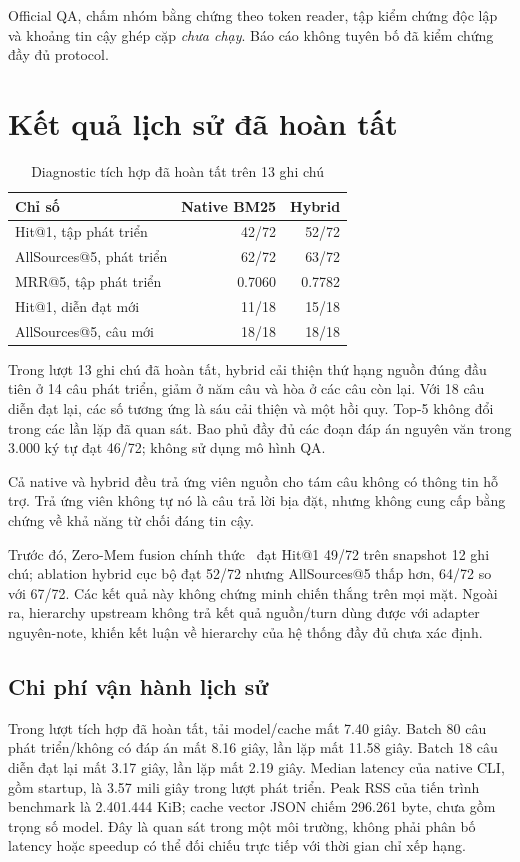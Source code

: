 \documentclass[conference]{IEEEtran}
\begin{document}
Official QA, chấm nhóm bằng chứng theo token reader, tập kiểm chứng độc lập và khoảng tin cậy ghép cặp \emph{chưa chạy}. Báo cáo không tuyên bố đã kiểm chứng đầy đủ protocol.

\section{Kết quả lịch sử đã hoàn tất}
\begin{table}[t]
\caption{Diagnostic tích hợp đã hoàn tất trên 13 ghi chú}
\label{tab:historical}
\centering\small
\begin{tabular}{@{}lrr@{}}
\toprule
Chỉ số & Native BM25 & Hybrid \\
\midrule
Hit@1, tập phát triển & 42/72 & 52/72 \\
AllSources@5, phát triển & 62/72 & 63/72 \\
MRR@5, tập phát triển & 0.7060 & 0.7782 \\
Hit@1, diễn đạt mới & 11/18 & 15/18 \\
AllSources@5, câu mới & 18/18 & 18/18 \\
\bottomrule
\end{tabular}
\end{table}

Trong lượt 13 ghi chú đã hoàn tất, hybrid cải thiện thứ hạng nguồn đúng đầu tiên ở 14 câu phát triển, giảm ở năm câu và hòa ở các câu còn lại. Với 18 câu diễn đạt lại, các số tương ứng là sáu cải thiện và một hồi quy. Top-5 không đổi trong các lần lặp đã quan sát. Bao phủ đầy đủ các đoạn đáp án nguyên văn trong 3.000 ký tự đạt 46/72; không sử dụng mô hình QA.

Cả native và hybrid đều trả ứng viên nguồn cho tám câu không có thông tin hỗ trợ. Trả ứng viên không tự nó là câu trả lời bịa đặt, nhưng không cung cấp bằng chứng về khả năng từ chối đáng tin cậy.

Trước đó, Zero-Mem fusion chính thức~\cite{zeromem} đạt Hit@1 49/72 trên snapshot 12 ghi chú; ablation hybrid cục bộ đạt 52/72 nhưng AllSources@5 thấp hơn, 64/72 so với 67/72. Các kết quả này không chứng minh chiến thắng trên mọi mặt. Ngoài ra, hierarchy upstream không trả kết quả nguồn/turn dùng được với adapter nguyên-note, khiến kết luận về hierarchy của hệ thống đầy đủ chưa xác định.

\subsection{Chi phí vận hành lịch sử}
Trong lượt tích hợp đã hoàn tất, tải model/cache mất 7.40 giây. Batch 80 câu phát triển/không có đáp án mất 8.16 giây, lần lặp mất 11.58 giây. Batch 18 câu diễn đạt lại mất 3.17 giây, lần lặp mất 2.19 giây. Median latency của native CLI, gồm startup, là 3.57 mili giây trong lượt phát triển. Peak RSS của tiến trình benchmark là 2.401.444 KiB; cache vector JSON chiếm 296.261 byte, chưa gồm trọng số model. Đây là quan sát trong một môi trường, không phải phân bố latency hoặc speedup có thể đối chiếu trực tiếp với thời gian chỉ xếp hạng.
\end{document}
